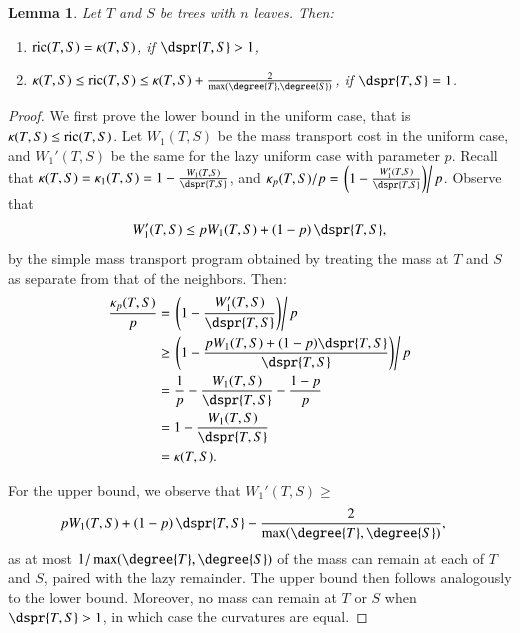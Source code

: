 \documentclass[]{elsarticle}
\newtheorem{lem}[thm]{Lemma}
\newcommand{\curvature}[2][]{%
    \ifthenelse{\equal{#1}{}}%
		{\kappa(#2)}%
		{\kappa_{#1}(#2)}%
}
\newcommand{\ric}[1]{
	\operatorname{ric}(#1)%
}
\begin{document}
\begin{lem}
\label{lem:asymptotic}
	Let $T$ and $S$ be trees with $n$ leaves.
	Then:
	\begin{enumerate}
		\item	$\ric{T,S} = \curvature{T,S}$, if $\dspr{T,S} > 1$,
		\item	$\curvature{T,S} \le \ric{T,S} \le \curvature{T,S} + \frac{2}{\max(\degree{T}, \degree{S})}$, if $\dspr{T,S} = 1$.
	\end{enumerate}
\end{lem}
\begin{proof}
	We first prove the lower bound in the uniform case, that is $\curvature{T,S} \le \ric{T,S}$.
	Let $W_1(T,S)$ be the mass transport cost in the uniform case, and $W_1'(T,S)$ be the same for the lazy uniform case with parameter $p$.
	Recall that $\curvature{T,S} = \curvature[1]{T,S} = 1 - \frac{W_1(T,S)}{\dspr{T,S}}$, and $\curvature[p]{T,S} / p = \left. \left(1 - \frac{W_1'(T,S)}{\dspr{T,S}}\right) \right/ p$.
	Observe that $$W_1'(T,S) \le pW_1(T,S) + (1-p) \, \dspr{T,S},$$ by the simple mass transport program obtained by treating the mass at $T$ and $S$ as separate from that of the neighbors.
	Then:
	\begin{align*}
		\frac{\curvature[p]{T,S}}{p} &= \left. \left(1 - \frac{W_1'(T,S)}{\dspr{T,S}}\right) \right/ p \\
		&\ge \left. \left(1 - \frac{pW_1(T,S) + (1-p)\dspr{T,S}}{\dspr{T,S}}\right) \right/ p \\
		&= \frac{1}{p} - \frac{W_1(T,S)}{\dspr{T,S}} - \frac{1-p}{p} \\
		&= 1 - \frac{W_1(T,S)}{\dspr{T,S}} \\
		&= \curvature{T,S}.
	\end{align*}

	For the upper bound, we observe that $W_1'(T,S) \ge$
	\begin{align*}
		p &W_1(T,S) + (1-p) \, \dspr{T,S} - \frac{2}{\max(\degree{T}, \degree{S})},
	\end{align*}
	as at most $1 / \max(\degree{T},\degree{S})$ of the mass can remain at each of $T$ and $S$, paired with the lazy remainder.
	The upper bound then follows analogously to the lower bound.
	Moreover, no mass can remain at $T$ or $S$ when $\dspr{T,S} > 1$, in which case the curvatures are equal.
\end{proof}
\end{document}
